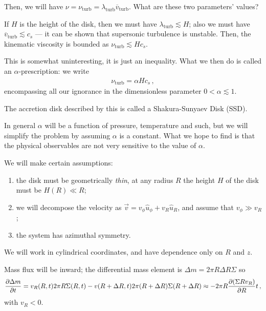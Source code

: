 \documentclass[main.tex]{subfiles}
\begin{document}

Then, we will have \(\nu = \nu _{\text{turb}} = \lambda _{\text{turb}} \overline{v} _{\text{turb}}\). What are these two parameters' values?

If \(H\) is the height of the disk, then we must have \(\lambda _{\text{turb}} \lesssim H\); also we must have \(\overline{v} _{\text{turb}} \lesssim c_s\) --- it can be shown that supersonic turbulence is unstable.
Then, the kinematic viscosity is bounded as \(\nu _{\text{turb}} \lesssim H c_s\).

This is somewhat uninteresting, it is just an inequality.
What we then do is called an \(\alpha \)-prescription: we write 
%
\begin{align}
\nu _{\text{turb}} = \alpha H c_s
\,,
\end{align}
%
encompassing all our ignorance in the dimensionless parameter \(0 < \alpha \lesssim 1\). 

The accretion disk described by this is called a Shakura-Sunyaev Disk (SSD). 

In general \(\alpha \) will be a function of pressure, temperature and such, but we will simplify the problem by assuming \(\alpha \) is a constant. 
What we hope to find is that the physical observables are not very sensitive to the value of \(\alpha \). 

We will make certain assumptions: 
\begin{enumerate}
    \item the disk must be geometrically \emph{thin}, at any radius \(R\) the height \(H\) of the disk must be \(H(R) \ll R\);
    \item we will decompose the velocity as \(\vec{v} = v_\phi \hat{u}_\phi + v_R \hat{u}_R\), and assume that \(v_\phi \gg v_R\);
    \item the system has azimuthal symmetry.
\end{enumerate}

We will work in cylindrical coordinates, and have dependence only on \(R\) and \(z\). 

Mass flux will be inward; the differential mass element is \(\Delta m = 2 \pi R \Delta R \Sigma \) so 
%
\begin{align}
\pdv{\Delta m}{t} = v_R (R, t) 2 \pi R \Sigma (R, t) - v(R + \Delta R, t) 2 \pi (R + \Delta R) \Sigma (R + \Delta R) \approx - 2 \pi R \pdv{(\Sigma R v_R)}{R}t
\,,
\end{align}
%
with \(v_R <0\). 
\end{document}
